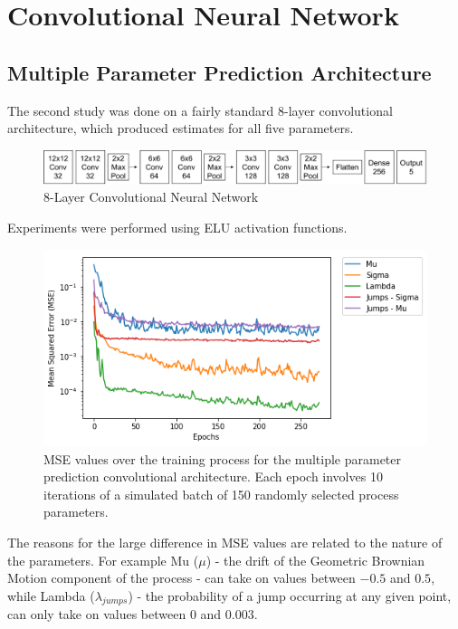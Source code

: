\documentclass[11pt,oneside,openany,a4paper,english, report, goldenblock
]{usthesis}
\begin{document}
\section{Convolutional Neural Network}

\subsection{Multiple Parameter Prediction Architecture}
\label{chap:ConvolutionalNeuralNetwork-section:MultipleParameterPredictionArchitecture}
The second study was done on a fairly standard 8-layer convolutional architecture, which produced estimates for all five parameters.

\begin{figure}[h]
	\centering
	\includegraphics[width=1\linewidth]{Images/Diagrams/Network-Structures/MultipleOutputCNN}
	\caption[Multiple Output Prediction CNN]{8-Layer Convolutional Neural Network}
	\label{fig:multipleoutputcnn}
\end{figure}

Experiments were performed using ELU activation functions. 

\begin{figure}[h]
	\centering
	\includegraphics[width=0.7\linewidth]{Images/Results/Training/COVNET_MO_MSE}
	\caption[MSE values over the training process for the 8-Layer Convolutional Neural Network]{MSE values over the training process for the multiple parameter prediction convolutional architecture. Each epoch involves 10 iterations of a simulated batch of 150 randomly selected process parameters.}
	\label{fig:covnetmomse}
\end{figure}

The reasons for the large difference in MSE values are related to the nature of the parameters. For example Mu ($\mu$) - the drift of the Geometric Brownian Motion component of the process - can take on values between $-0.5$ and $0.5$, while Lambda ($\lambda_{jumps}$) - the probability of a jump occurring at any given point, can only take on values between $0$ and $0.003$.
\end{document}
